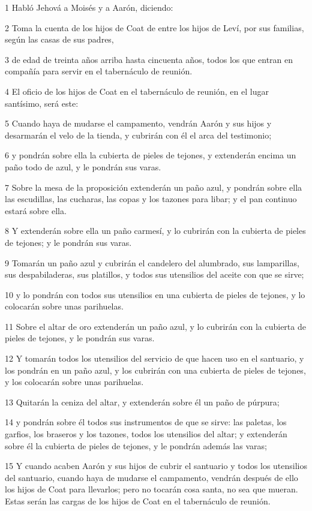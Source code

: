 \par 1 Habló Jehová a Moisés y a Aarón, diciendo:
\par 2 Toma la cuenta de los hijos de Coat de entre los hijos de Leví, por sus familias, según las casas de sus padres,
\par 3 de edad de treinta años arriba hasta cincuenta años, todos los que entran en compañía para servir en el tabernáculo de reunión. 
\par 4 El oficio de los hijos de Coat en el tabernáculo de reunión, en el lugar santísimo, será este:
\par 5 Cuando haya de mudarse el campamento, vendrán Aarón y sus hijos y desarmarán el velo de la tienda, y cubrirán con él el arca del testimonio;
\par 6 y pondrán sobre ella la cubierta de pieles de tejones, y extenderán encima un paño todo de azul, y le pondrán sus varas.
\par 7 Sobre la mesa de la proposición extenderán un paño azul, y pondrán sobre ella las escudillas, las cucharas, las copas y los tazones para libar; y el pan continuo estará sobre ella.
\par 8 Y extenderán sobre ella un paño carmesí, y lo cubrirán con la cubierta de pieles de tejones; y le pondrán sus varas.
\par 9 Tomarán un paño azul y cubrirán el candelero del alumbrado, sus lamparillas, sus despabiladeras, sus platillos, y todos sus utensilios del aceite con que se sirve;
\par 10 y lo pondrán con todos sus utensilios en una cubierta de pieles de tejones, y lo colocarán sobre unas parihuelas.
\par 11 Sobre el altar de oro extenderán un paño azul, y lo cubrirán con la cubierta de pieles de tejones, y le pondrán sus varas.
\par 12 Y tomarán todos los utensilios del servicio de que hacen uso en el santuario, y los pondrán en un paño azul, y los cubrirán con una cubierta de pieles de tejones, y los colocarán sobre unas parihuelas.
\par 13 Quitarán la ceniza del altar, y extenderán sobre él un paño de púrpura;
\par 14 y pondrán sobre él todos sus instrumentos de que se sirve: las paletas, los garfios, los braseros y los tazones, todos los utensilios del altar; y extenderán sobre él la cubierta de pieles de tejones, y le pondrán además las varas;
\par 15 Y cuando acaben Aarón y sus hijos de cubrir el santuario y todos los utensilios del santuario, cuando haya de mudarse el campamento, vendrán después de ello los hijos de Coat para llevarlos; pero no tocarán cosa santa, no sea que mueran. Estas serán las cargas de los hijos de Coat en el tabernáculo de reunión.
